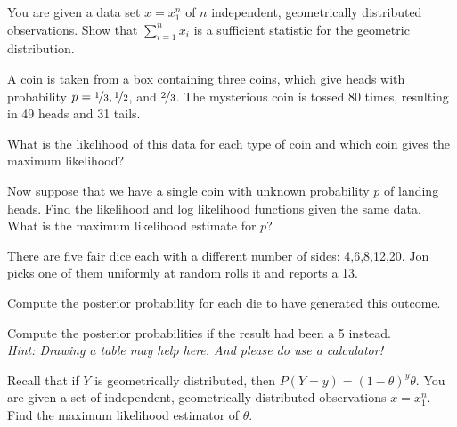 \documentclass[10pt, a5paper]{scrartcl}
\begin{document}
\boardquestions

\begin{exercise}
  You are given a data set $ x=x_{1}^{n} $ of $ n $ independent, geometrically
  distributed observations. Show that $ \sum_{i=1}^{n} x_i $ is a sufficient
  statistic for the geometric distribution.
\end{exercise}


\begin{exercise}[Covariance]
  A coin is taken from a box containing three coins, which give heads with
  probability $p = \nicefrac{1}{3}, \nicefrac{1}{2}$, and $\nicefrac{2}{3}$.
  The mysterious coin is tossed 80 times, resulting in 49 heads and 31 tails.

  \begin{subex}
    What is the likelihood of this data for each type of coin and which coin
    gives the maximum likelihood?
  \end{subex}
  
  \begin{subex}
    Now suppose that we have a single coin with unknown probability $p$ of
    landing heads. Find the likelihood and log likelihood functions given the
    same data. What is the maximum likelihood estimate for $p$?
  \end{subex}
\end{exercise}


\begin{exercise}[Dice]
  There are five fair dice each with a different number of sides: 4,6,8,12,20.
  Jon picks one of them uniformly at random rolls it and reports a 13.
  
  \begin{subex}	
    Compute the posterior probability for each die to have generated this
    outcome.
  \end{subex}
  
  \begin{subex}	
    Compute the posterior probabilities if the result had been a 5 instead. \\
    \emph{Hint: Drawing a table may help here. And please do use a calculator!}
  \end{subex}
\end{exercise}


\begin{exercise}
  Recall that if $Y$ is  geometrically distributed, then 
  $P(Y=y) = (1-\theta)^{y}\theta$.
  You are given a set of independent, geometrically distributed observations 
  $x = x_{1}^{n}$. Find the maximum likelihood estimator of $\theta$.
\end{exercise}

\vfill\creditsboardquestions
\end{document}

